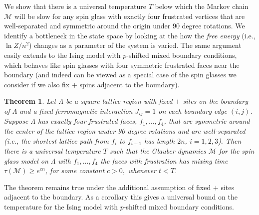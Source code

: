 \documentclass[letterpaper,english,numberwithinsect]{amsart}
\newtheorem{theorem}{Theorem}
\begin{document}
We show that there is a universal temperature $T$ below which the Markov chain $\mathcal{M}$ will be slow for any spin glass with exactly four frustrated vertices that are well-separated and symmetric around the origin under $90$ degree rotations.  We identify a bottleneck in the state space by looking at the how the  {\it free energy} (i.e., $\ln Z /n^2$) changes as a parameter of the system is varied.  The same argument easily extends to the Ising model with $p$-shifted mixed boundary conditions, which behaves like spin glasses with four symmetric frustrated faces near the boundary (and  indeed can be viewed as a special case of the spin glasses we consider if we also fix $+$ spins adjacent to the boundary).


\begin{theorem}\label{thm:main}
Let $\Lambda$ be a square lattice region
with fixed $+$ sites on the boundary of $\Lambda$ and a fixed ferromagnetic interaction $J_{ij} = 1$ on each boundary edge $(i, j)$.
Suppose $\Lambda$ has  exactly four frustrated faces,  $f_1, \dots, f_4$, that are symmetric around the center of the lattice region under 90 degree rotations and are well-separated (i.e., the shortest lattice path from $f_i$ to $f_{i+1}$ has length $2n$, $i = 1, 2, 3$).  
Then there is a universal temperature 
$T$
such that  the Glauber dynamics ${\mathcal M}$ for the spin glass model on $\Lambda$ with $f_1,...,f_4$ the faces with frustration has mixing time  $\tau({\mathcal{M}}) \geq e^{cn}$, for some constant $c>0,$ whenever $t < T$.
\end{theorem}
\noindent 
The theorem remains true under the additional assumption of fixed $+$ sites adjacent to the boundary.  As a corollary this  gives a universal bound on the temperature for the Ising model with $p$-shifted mixed boundary conditions.
\end{document}
